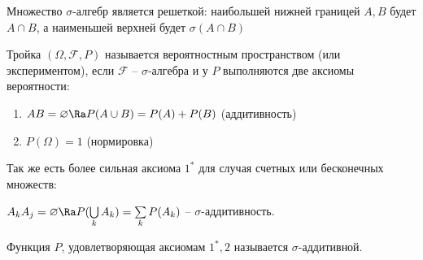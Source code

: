 Множество $\sigma$-алгебр является решеткой: наибольшей нижней границей $A, B$ будет $A \cap B$, а наименьшей верхней будет $\sigma(A \cap B)$

\begin{Def}
    Тройка $(\Omega, \mathcal{F}, P)$ называется вероятностным пространством (или экспериментом), если $\mathcal{F}$ -- $\sigma$-алгебра и у $P$ выполняются две аксиомы вероятности:
    \begin{enumerate}
        \item $AB = \varnothing \Ra P(A \cup B) = P(A) + P(B)$ (аддитивность)
        \item $P(\Omega) = 1$ (нормировка)
    \end{enumerate}
\end{Def}
Так же есть более сильная аксиома $1^*$ для случая счетных или бесконечных множеств:

$A_kA_j = \varnothing \Ra P(\bigcup\limits_k A_k) = \sum\limits_k P(A_k)$ -- $\sigma$-аддитивность.
\begin{Rem}
Функция $P$, удовлетворяющая аксиомам $1^*, 2$ называется $\sigma$-аддитивной.
\end{Rem}

